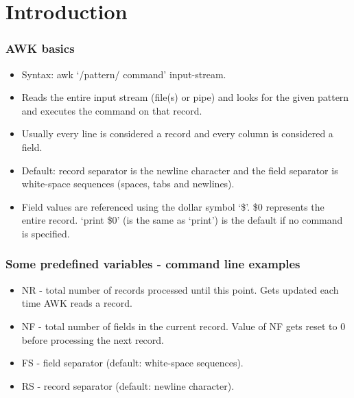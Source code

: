 \documentclass[xcolor=svgnames]{beamer}
\begin{document}
\section{Introduction}
\begin{frame}
    \frametitle{AWK basics}
    \begin{itemize}
        \item Syntax: awk `/pattern/ {command}' input-stream.
        \item Reads the entire input stream (file(s) or pipe) and looks for the given pattern and executes the command on that record.
        \item Usually every line is considered a record and every column is considered a field.
        \item Default: record separator is the newline character and the field separator is white-space sequences (spaces, tabs and newlines).
        \item Field values are referenced using the dollar symbol `\$'. \$0 represents the entire record. `print \$0' (is the same as `print') is the default if no command is specified.
    \end{itemize}
\end{frame}
\begin{frame}
    \frametitle{Some predefined variables - command line examples}
    \begin{itemize}
        \item NR - total number of records processed until this point. Gets updated each time AWK reads a record.
        \item NF - total number of fields in the current record. Value of NF gets reset to 0 before processing the next record.
        \item FS - field separator (default: white-space sequences).
        \item RS - record separator (default: newline character).
    \end{itemize}
\end{frame}
\end{document}
